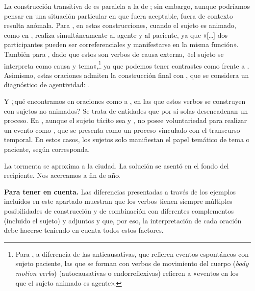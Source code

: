 La construcción transitiva de  es paralela a la de
; sin embargo, aunque podríamos pensar en una situación
particular en que  fuera aceptable, fuera de contexto
resulta anómala. Para \textcite[200]{kovacci1992}, en estas construcciones,
cuando el sujeto es animado, como en , realiza
simultáneamente al agente y al paciente, ya que «[\ldots] dos participantes
pueden ser correferenciales y manifestarse en la misma función». También para
\textcite[1593]{mendikoetxea1999}, dado que estos son verbos de causa externa,
«el sujeto se interpreta como causa y tema»,\footnote{Para
\textcite[495]{martinezrojas2021}, a diferencia de las anticausativas, que
refieren eventos espontáneos con sujeto paciente, las que se forman con verbos
de movimiento del cuerpo (\textit{body motion verbs}) (autocausativas o
endorreflexivas) refieren a «eventos en los que el sujeto animado es agente».}
ya que podemos tener contrastes como  frente a . Asimismo, estas oraciones
admiten la construcción final con , que se considera un diagnóstico
de agentividad: .

Y ¿qué encontramos en oraciones como  a
, en las que estos verbos se construyen con sujetos no
animados? Se trata de entidades que por sí solas desencadenan un proceso. En
, aunque el sujeto tácito  sea
 y , no posee voluntariedad para realizar un evento como
, que se presenta como un proceso vinculado con el
transcurso temporal. En estos casos, los sujetos solo manifiestan el papel
temático de tema o paciente, según corresponda.

\begin{exe}
  \ex\label{ex:10-tormenta} La tormenta se aproxima a la ciudad.
  \ex La solución se asentó en el fondo del recipiente.
  \ex\label{ex:10-findeano} Nos acercamos a fin de año.
\end{exe}

\begin{destacado}
\textbf{Para tener en cuenta.} Las diferencias presentadas a través de los
ejemplos incluidos en este apartado muestran que los verbos tienen siempre
múltiples posibilidades de construcción y de combinación con diferentes
complementos (incluido el sujeto) y adjuntos y que, por eso, la interpretación de
cada oración debe hacerse teniendo en cuenta todos estos factores.
\end{destacado}

